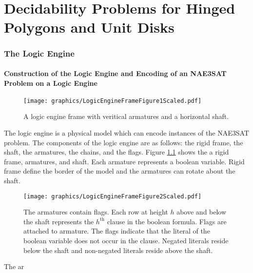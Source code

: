 


\chapter{Decidability Problems for Hinged Polygons and Unit Disks}
\subsection{The Logic Engine}

\subsubsection{Construction of the Logic Engine and Encoding of an NAE3SAT Problem on a Logic 
Engine}

\begin{figure}[!h]
\begin{center}
\texttt{[image: graphics/LogicEngineFrameFigure1Scaled.pdf]}
\caption{A logic engine frame with veritical armatures and a horizontal 
shaft.  }\label{fig:LogicEngineFrameFigure1.pdf}
\end{center}
\end{figure}
The logic engine is a physical model which can encode instances of the NAE3SAT problem.  The 
components of the logic engine are as follows: the rigid frame, the shaft, the armatures,
the chains, and the flags.  Figure \ref{fig:LogicEngineFrameFigure1.pdf} shows the a rigid frame, 
armatures, and shaft.  Each armature represents a boolean variable.  Rigid frame define the border 
of the model and the armatures can rotate about the shaft.
\begin{figure}[!h]
\begin{center}
\texttt{[image: graphics/LogicEngineFrameFigure2Scaled.pdf]}
\caption{The armatures contain flags.  Each row at height $h$ 
above and below the shaft represents the $h^\text{th}$ clause in the boolean formula.  Flags are 
attached to armature.  The flags indicate that the literal of the boolean variable does not occur 
in the clause.  Negated literals reside below the shaft and non-negated literals reside above the 
shaft. 
}\label{LogicEngineFrameFigure2.pdf}
\end{center}
\end{figure}
The ar

